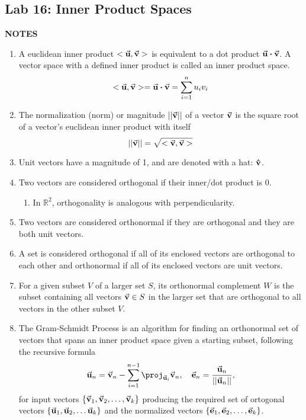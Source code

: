 \documentclass[12pt]{article}
\newcommand{\notes}{\textbf{NOTES}}
\begin{document}
\subsection{Lab 16: Inner Product Spaces}

\notes

\begin{enumerate}
  \item A euclidean inner product $<\va{u}, \va{v}>$ is equivalent to a dot product $\va{u} \vdot \va{v}$. A vector space with a defined inner product is called an inner product space.
\begin{equation}
<\va{u},\va{v}> = \va{u} \vdot \va{v} = \sum_{i=1}^{n} u_{i} v_{i}
\end{equation}
\item The normalization (norm) or magnitude $||\va{v}||$ of a vector $\va{v}$ is the square root of a vector's euclidean inner product with itself
\begin{equation}
||\va{v}|| = \sqrt{<\va{v},\va{v}>}
\end{equation}
\item Unit vectors have a magnitude of 1, and are denoted with a hat: $\vu{v}$.
\item Two vectors are considered orthogonal if their inner/dot product is 0.
\begin{enumerate}
\item In $\mathbb{R}^{2}$, orthogonality is analogous with perpendicularity.
\end{enumerate}
\item Two vectors are considered orthonormal if they are orthogonal and they are both unit vectors.
\item A set is considered orthogonal if all of its enclosed vectors are orthogonal to each other and orthonormal if all of its enclosed vectors are unit vectors.
\item For a given subset $V$ of a larger set $S$, its orthonormal complement $W$ is the subset containing all vectors $\va{v} \in S$ in the larger set that are orthogonal to all vectors in the other subset $V$.
\item The Gram-Schmidt Process is an algorithm for finding an orthonormal set of vectors that spans an inner product space given a starting subset, following the recursive formula
\begin{equation}
\va{u}_{n} = \va{v}_{n} - \sum_{i=1}^{n-1} \proj_{\va{u}_{i}} \va{v}_{n}, \hspace{1em} \va{e}_{n} = \frac{\va{u}_{n}}{||\va{u}_{n}||},
\end{equation}
for input vectors $\{\va{v}_{1}, \va{v}_{2}, \dots, \va{v}_{k} \}$ producing the required set of ortogonal vectors $\{ \va{u}_{1}, \va{u}_{2}, \dots \va{u}_{k} \}$ and the normalized vectors $\{\va{e}_{1}, \va{e}_{2}, \dots, \va{e}_{k} \}$.
\end{enumerate}
\end{document}
